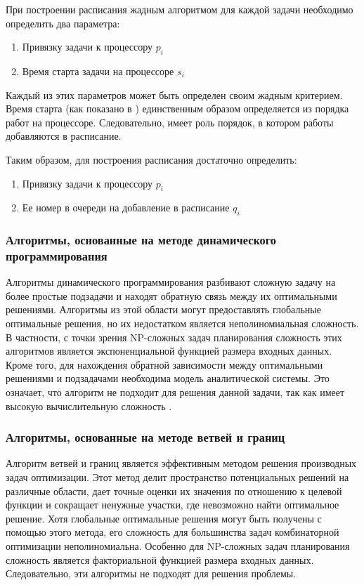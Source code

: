 При построении расписания жадным алгоритмом для каждой задачи необходимо определить два параметра:
\begin{enumerate}
    \item Привязку задачи к процессору $p_i$
    \item Время старта задачи на процессоре $s_i$
\end{enumerate}
Каждый из этих параметров может быть определен своим жадным критерием. Время старта (как показано в \cite{Kalashnikov_2004}) единственным образом определяется из порядка работ на процессоре. Следовательно, имеет роль порядок, в котором работы добавляются в расписание.

Таким образом, для построения расписания достаточно определить:
\begin{enumerate}
    \item Привязку задачи к процессору $p_i$
    \item Ее номер в очереди на добавление в расписание $q_i$
\end{enumerate}

\subsubsection{Алгоритмы, основанные на методе динамического программирования}

Алгоритмы динамического программирования разбивают сложную задачу на более простые подзадачи и находят обратную связь между их оптимальными решениями. Алгоритмы из этой области могут предоставлять глобальные оптимальные решения, но их недостатком является неполиномиальная сложность. В частности, с точки зрения NP-сложных задач планирования сложность этих алгоритмов является экспоненциальной функцией размера входных данных. Кроме того, для нахождения обратной зависимости между оптимальными решениями и подзадачами необходима модель аналитической системы. Это означает, что алгоритм не подходит для решения данной задачи, так как имеет высокую вычислительную сложность \cite{Dynamic_prog}.

\subsubsection{Алгоритмы, основанные на методе ветвей и границ}

Алгоритм ветвей и границ является эффективным методом решения производных задач оптимизации. Этот метод делит пространство потенциальных решений на различные области, дает точные оценки их значения по отношению к целевой функции и сокращает ненужные участки, где невозможно найти оптимальное решение. Хотя глобальные оптимальные решения могут быть получены с помощью этого метода, его сложность для большинства задач комбинаторной оптимизации неполиномиальна. Особенно для NP-сложных задач планирования сложность является факториальной функцией размера входных данных. Следовательно, эти алгоритмы не подходят для решения проблемы.

